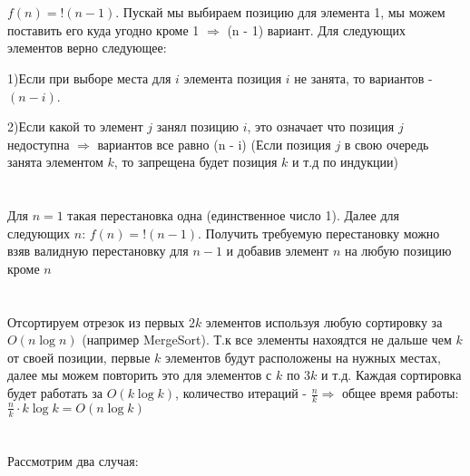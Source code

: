 \documentclass{article}
\begin{document}
\begin{flushleft}
\section{}

$f(n) = !(n - 1)$. Пускай мы выбираем позицию для элемента 1, мы можем поставить его куда угодно кроме 1 $\Rightarrow$ (n - 1) вариант. Для следующих элементов верно следующее:

1)Если при выборе места для $i$ элемента позиция $i$ не занята, то вариантов - $(n - i)$.

2)Если какой то элемент $j$ занял позицию $i$, это означает что позиция $j$ недоступна $\Rightarrow$ вариантов все равно (n - i) (Если позиция $j$ в свою очередь занята элементом $k$, то запрещена будет позиция $k$ и т.д по индукции)

\section{}

Для $n = 1$ такая перестановка одна (единственное число 1). Далее для следующих $n$: $f(n) = !(n - 1)$. Получить требуемую перестановку можно взяв валидную перестановку для $n - 1$ и добавив элемент $n$ на любую позицию кроме $n$

\section{}



\section{}

Отсортируем отрезок из первых $2k$ элементов используя любую сортировку за $O(n\log{n})$ (например MergeSort). Т.к все элементы нахоядтся не дальше чем $k$ от своей позиции, первые $k$ элементов будут расположены на нужных местах, далее мы можем повторить это для элементов с $k$ по $3k$ и т.д. Каждая сортировка будет работать за $O(k\log{k})$, количество итераций - $\frac{n}{k} \Rightarrow$ общее время работы: $\frac{n}{k} \cdot k\log{k} = O(n\log{k})$

\section{}

Рассмотрим два случая:


\end{flushleft}
\end{document}
